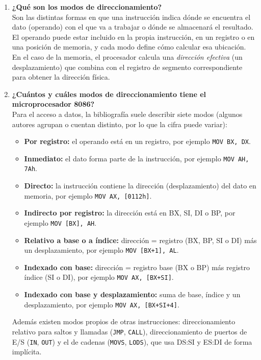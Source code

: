 \documentclass[10pt]{article}
\begin{document}
\begin{enumerate}
  \item \textbf{¿Qué son los modos de direccionamiento?}\\
  Son las distintas formas en que una instrucción indica dónde se encuentra el dato (operando) con el que va a trabajar o dónde se almacenará el resultado. El operando puede estar incluido en la propia instrucción, en un registro o en una posición de memoria, y cada modo define cómo calcular esa ubicación. En el caso de la memoria, el procesador calcula una \textit{dirección efectiva} (un desplazamiento) que combina con el registro de segmento correspondiente para obtener la dirección física.

  \item \textbf{¿Cuántos y cuáles modos de direccionamiento tiene el microprocesador 8086?}\\
  Para el acceso a datos, la bibliografía suele describir siete modos (algunos autores agrupan o cuentan distinto, por lo que la cifra puede variar):
  \begin{itemize}
    \item \textbf{Por registro:} el operando está en un registro, por ejemplo \texttt{MOV BX, DX}.
    \item \textbf{Inmediato:} el dato forma parte de la instrucción, por ejemplo \texttt{MOV AH, 7Ah}.
    \item \textbf{Directo:} la instrucción contiene la dirección (desplazamiento) del dato en memoria, por ejemplo \texttt{MOV AX, [0112h]}.
    \item \textbf{Indirecto por registro:} la dirección está en BX, SI, DI o BP, por ejemplo \texttt{MOV [BX], AH}.
    \item \textbf{Relativo a base o a índice:} dirección = registro (BX, BP, SI o DI) más un desplazamiento, por ejemplo \texttt{MOV [BX+1], AL}.
    \item \textbf{Indexado con base:} dirección = registro base (BX o BP) más registro índice (SI o DI), por ejemplo \texttt{MOV AX, [BX+SI]}.
    \item \textbf{Indexado con base y desplazamiento:} suma de base, índice y un desplazamiento, por ejemplo \texttt{MOV AX, [BX+SI+4]}.
  \end{itemize}
  Además existen modos propios de otras instrucciones: direccionamiento relativo para saltos y llamadas (\texttt{JMP}, \texttt{CALL}), direccionamiento de puertos de E/S (\texttt{IN}, \texttt{OUT}) y el de cadenas (\texttt{MOVS}, \texttt{LODS}), que usa DS:SI y ES:DI de forma implícita.


\end{enumerate}
\end{document}
